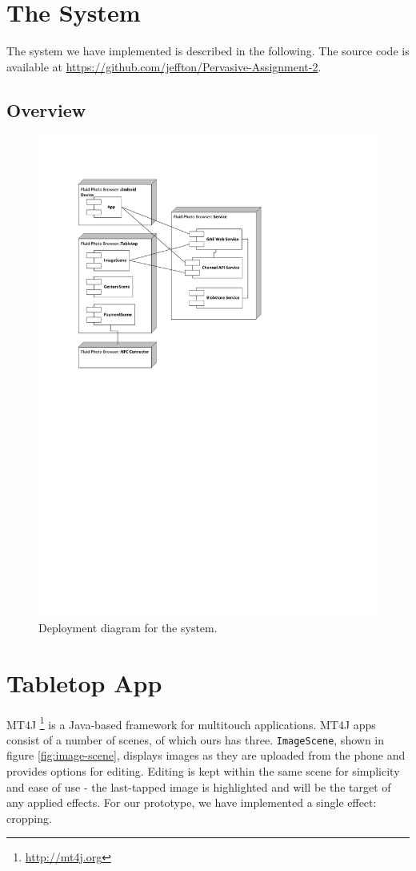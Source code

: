 \documentclass{ubicomp2011}
\begin{document}
\section{The System}
The system we have implemented is described in the following. The source code is available at \url{https://github.com/jeffton/Pervasive-Assignment-2}.

\subsection{Overview}

\begin{figure}[t]
\begin{center}
\includegraphics[width=0.90\columnwidth]{deployment-diagram-fluit-photo-browser.pdf}
\end{center}
\caption{Deployment diagram for the system.}
\label{fig:deployment-diagram}
\end{figure}

\section{Tabletop App}
MT4J \footnote{\url{http://mt4j.org}} is a Java-based framework for multitouch applications. MT4J apps consist of a number of scenes, of which ours has three. \lstinline{ImageScene}, shown in figure \ref{fig:image-scene}, displays images as they are uploaded from the phone and provides options for editing. Editing is kept within the same scene for simplicity and ease of use - the last-tapped image is highlighted and will be the target of any applied effects. For our prototype, we have implemented a single effect: cropping.
\end{document}
